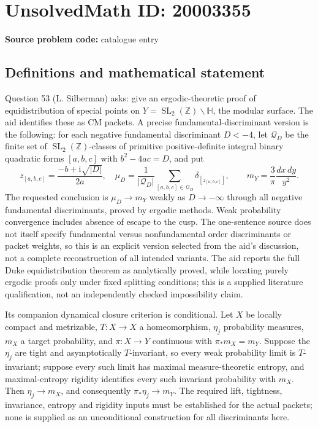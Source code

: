 \documentclass[11pt]{article}
\newcommand{\Z}{\mathbb{Z}}
\begin{document}
\section*{UnsolvedMath ID: 20003355}
\textbf{Source problem code:} catalogue entry
\subsection{Definitions and mathematical statement}
Question 53 (L. Silberman) asks: give an ergodic-theoretic proof of equidistribution of special points on $Y=\operatorname{SL}_2(\Z)\backslash\mathbb H$, the modular surface. The aid identifies these as CM packets. A precise fundamental-discriminant version is the following: for each negative fundamental discriminant $D<-4$, let $\mathcal Q_D$ be the finite set of $\operatorname{SL}_2(\Z)$-classes of primitive positive-definite integral binary quadratic forms $[a,b,c]$ with $b^2-4ac=D$, and put
\[
 z_{[a,b,c]}=\frac{-b+\mathrm i\sqrt{|D|}}{2a},\quad
 \mu_D=\frac1{|\mathcal Q_D|}\sum_{[a,b,c]\in\mathcal Q_D}\delta_{[z_{[a,b,c]}]},
 \qquad m_Y=\frac3\pi\frac{dx\,dy}{y^2}.
\]
The requested conclusion is $\mu_D\to m_Y$ weakly as $D\to-\infty$ through all negative fundamental discriminants, proved by ergodic methods. Weak probability convergence includes absence of escape to the cusp. The one-sentence source does not itself specify fundamental versus nonfundamental order discriminants or packet weights, so this is an explicit version selected from the aid's discussion, not a complete reconstruction of all intended variants. The aid reports the full Duke equidistribution theorem as analytically proved, while locating purely ergodic proofs only under fixed splitting conditions; this is a supplied literature qualification, not an independently checked impossibility claim.

Its companion dynamical closure criterion is conditional. Let $X$ be locally compact and metrizable, $T:X\to X$ a homeomorphism, $\eta_j$ probability measures, $m_X$ a target probability, and $\pi:X\to Y$ continuous with $\pi_*m_X=m_Y$. Suppose the $\eta_j$ are tight and asymptotically $T$-invariant, so every weak probability limit is $T$-invariant; suppose every such limit has maximal measure-theoretic entropy, and maximal-entropy rigidity identifies every such invariant probability with $m_X$. Then $\eta_j\to m_X$, and consequently $\pi_*\eta_j\to m_Y$. The required lift, tightness, invariance, entropy and rigidity inputs must be established for the actual packets; none is supplied as an unconditional construction for all discriminants here.
\end{document}
